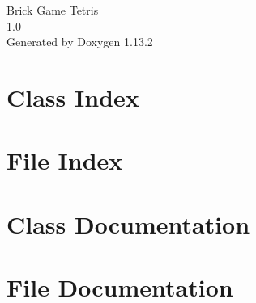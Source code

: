 \documentclass[twoside]{book}
\newcommand{\+}{\discretionary{\mbox{\scriptsize$\hookleftarrow$}}{}{}}
\newcommand{\clearemptydoublepage}{%
    \newpage{\pagestyle{empty}\cleardoublepage}%
  }
\begin{document}
  \raggedbottom
    \hypersetup{pageanchor=false,
                bookmarksnumbered=true,
                pdfencoding=unicode
               }
  \begin{titlepage}
  \vspace*{7cm}
  \begin{center}%
  {\Large Brick Game Tetris}\\
  [1ex]\large 1.\+0 \\
  \vspace*{1cm}
  {\large Generated by Doxygen 1.13.2}\\
  \end{center}
  \end{titlepage}
  \clearemptydoublepage
  \tableofcontents
  \clearemptydoublepage
  \hypersetup{pageanchor=true}
\chapter{Class Index}

\chapter{File Index}

\chapter{Class Documentation}



\chapter{File Documentation}




  \backmatter
  \newpage
  \clearemptydoublepage
  \printindex
\end{document}
